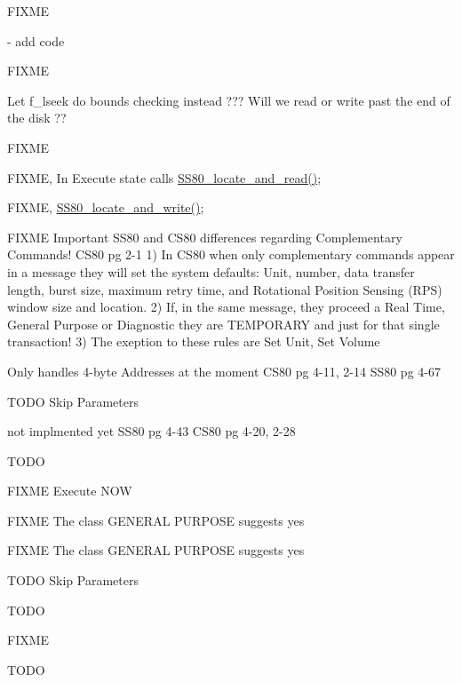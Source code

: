 \begin{DoxyRefList}
F\+I\+X\+ME  
\item[\label{todo__todo000047}%
\hypertarget{todo__todo000047}{}%
Global \hyperlink{ss80_8h_ab54868f20762a1bb3e57f65fd191e937}{S\+S80\+\_\+\+Cancel} (void)]-\/ add code 

F\+I\+X\+ME  
\item[\label{todo__todo000041}%
\hypertarget{todo__todo000041}{}%
Global \hyperlink{ss80_8h_a0d2e3b28c642ea89fea6ff6f8ced5a3b}{S\+S80\+\_\+cmd\+\_\+seek} (void)]Let f\+\_\+lseek do bounds checking instead ??? Will we read or write past the end of the disk ??  
\item[\label{todo__todo000014}%
\hypertarget{todo__todo000014}{}%
Global \hyperlink{ss80_8h_a98c1da720b6dbe5ee9f13b914a913e17}{S\+S80\+\_\+\+Command\+\_\+\+State} (void)]F\+I\+X\+ME 

F\+I\+X\+ME, In Execute state calls \hyperlink{ss80_8c_acad6de863f4566b55cb8860eb1ffd09c}{S\+S80\+\_\+locate\+\_\+and\+\_\+read()}; 

F\+I\+X\+ME, \hyperlink{ss80_8c_a41ef37ec5419463815401485cfcb62b1}{S\+S80\+\_\+locate\+\_\+and\+\_\+write()}; 

F\+I\+X\+ME Important S\+S80 and C\+S80 differences regarding Complementary Commands! C\+S80 pg 2-\/1 1) In C\+S80 when only complementary commands appear in a message they will set the system defaults\+: Unit, number, data transfer length, burst size, maximum retry time, and Rotational Position Sensing (R\+PS) window size and location. 2) If, in the same message, they proceed a Real Time, General Purpose or Diagnostic they are T\+E\+M\+P\+O\+R\+A\+RY and just for that single transaction! 3) The exeption to these rules are Set Unit, Set Volume 

Only handles 4-\/byte Addresses at the moment C\+S80 pg 4-\/11, 2-\/14 S\+S80 pg 4-\/67 

T\+O\+DO Skip Parameters 

not implmented yet S\+S80 pg 4-\/43 C\+S80 pg 4-\/20, 2-\/28 

T\+O\+DO 

F\+I\+X\+ME Execute N\+OW 

F\+I\+X\+ME The class G\+E\+N\+E\+R\+AL P\+U\+R\+P\+O\+SE suggests yes 

F\+I\+X\+ME The class G\+E\+N\+E\+R\+AL P\+U\+R\+P\+O\+SE suggests yes 

T\+O\+DO Skip Parameters 

T\+O\+DO 

F\+I\+X\+ME 

T\+O\+DO 


\end{DoxyRefList}

